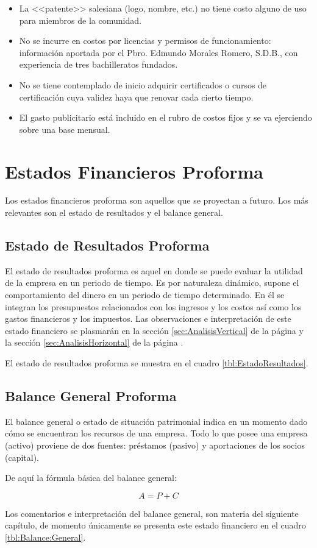 \begin{itemize}
	\item La <<patente>> salesiana (logo, nombre, etc.) no tiene costo alguno de uso para miembros de la comunidad.
	\item No se incurre en costos por licencias y permisos de funcionamiento: información aportada por el Pbro. Edmundo Morales Romero, S.D.B., con experiencia de tres bachilleratos fundados.
	\item No se tiene contemplado de inicio adquirir certificados o cursos de certificación cuya validez haya que renovar cada cierto tiempo.
	\item El gasto publicitario está incluido en el rubro de costos fijos y se va ejerciendo sobre una base mensual.
\end{itemize}

\section{Estados Financieros Proforma}

Los estados financieros proforma son aquellos que se proyectan a futuro. Los más relevantes son el estado de resultados y el balance general.

\subsection{Estado de Resultados Proforma}

El estado de resultados proforma es aquel en donde se puede evaluar la utilidad de la empresa en un periodo de tiempo. Es por naturaleza dinámico, supone el comportamiento del dinero en un periodo de tiempo determinado. En él se integran los presupuestos relacionados con los ingresos y los costos así como los gastos financieros y los impuestos. Las observaciones e interpretación de este estado financiero se plasmarán en la sección \ref{sec:AnalisisVertical} de la página \pageref{sec:AnalisisVertical} y la sección \ref{sec:AnalisisHorizontal} de la página \pageref{sec:AnalisisHorizontal}.

El estado de resultados proforma se muestra en el cuadro \ref{tbl:EstadoResultados}.

\subsection{Balance General Proforma}

El balance general o estado de situación patrimonial indica en un momento dado cómo se encuentran los recursos de una empresa. Todo lo que posee una empresa (activo) proviene de dos fuentes: préstamos (pasivo) y aportaciones de los socios (capital).

De aquí la fórmula básica del balance general:

$$ A = P + C $$

Los comentarios e interpretación del balance general, son materia del siguiente capítulo, de momento únicamente se presenta este estado financiero en el cuadro \ref{tbl:Balance:General}.




